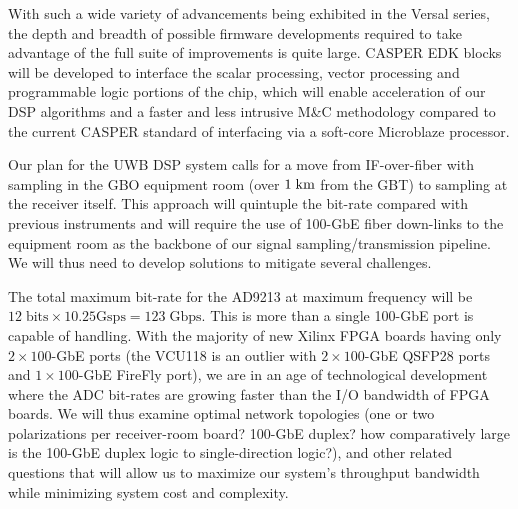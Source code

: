 \documentclass[10pt]{myNSF}
\begin{document}
With such a wide variety of advancements being exhibited in the Versal
series, the depth and breadth of possible firmware developments
required to take advantage of the full suite of improvements is quite
large.  CASPER EDK blocks will be developed to interface the scalar
processing, vector processing and programmable logic portions of the
chip, which will enable acceleration of our DSP algorithms and a
faster and less intrusive M\&C methodology compared to the current
CASPER standard of interfacing via a soft-core Microblaze processor.


\label{sec:networking}

Our plan for the UWB DSP system calls for a move from IF-over-fiber
with sampling in the GBO equipment room (over $1\; \textrm{km}$ from the GBT)
to sampling at the receiver itself.  This approach will quintuple the
bit-rate compared with previous instruments and will require the use
of 100-GbE fiber down-links to the equipment room as the backbone of
our signal sampling/transmission pipeline.  We will thus need to
develop solutions to mitigate several challenges.

The total maximum bit-rate for the AD9213 at maximum frequency will be
$12\; \mathrm{bits} \times 10.25 \mathrm{Gsps} = 123\; \mathrm{Gbps}$.
This is more than a single 100-GbE port is capable of handling.  With
the majority of new Xilinx FPGA boards having only $2 \times 100$-GbE
ports (the VCU118 is an outlier with $2 \times100$-GbE QSFP28 ports
and $1 \times 100$-GbE FireFly port), we are in an age of
technological development where the ADC bit-rates are growing faster
than the I/O bandwidth of FPGA boards. We will thus examine optimal
network topologies (one or two polarizations per receiver-room board?
100-GbE duplex? how comparatively large is the 100-GbE duplex logic to
single-direction logic?), and other related questions that will allow
us to maximize our system's throughput bandwidth while minimizing
system cost and complexity.
\end{document}

